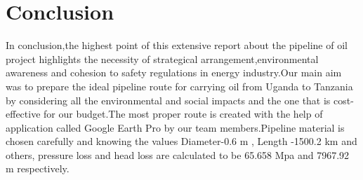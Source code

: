 \documentclass[12pt]{article}
\begin{document}
\section*{Conclusion}
{\fontsize{12pt}{12pt}\selectfont
\hspace*{1em} In conclusion,the highest point of this extensive report about the pipeline of oil project highlights the necessity of strategical arrangement,environmental awareness and cohesion to safety regulations in energy industry.Our main aim was to prepare the ideal pipeline route for carrying oil from Uganda to Tanzania by considering all the environmental and social impacts and the one that is cost-effective for our budget.The most proper route is created with the help of application called Google Earth Pro by our team members.Pipeline material is chosen carefully and knowing the values Diameter-0.6 m , Length -1500.2 km and others, pressure loss and head loss are calculated to be 65.658 Mpa and 7967.92 m respectively.

}
\end{document}
